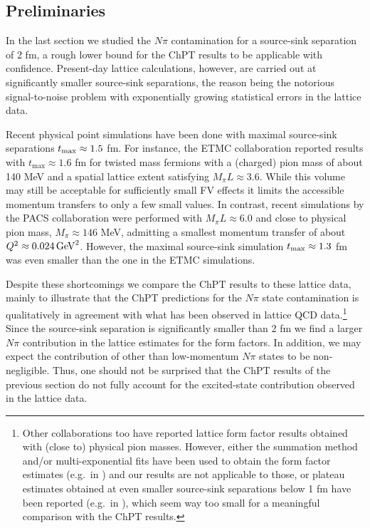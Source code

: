 \documentclass[11pt,prd,aps,showpacs,eqsecnum,floatfix,nofootinbib,preprint,tightenlines]{revtex4}
\begin{document}
 \subsection{Preliminaries}

In the last section we studied the $N\pi$ contamination for a source-sink separation of 2 fm, a rough lower bound for the ChPT results to be applicable with confidence. Present-day lattice calculations, however, are carried out at significantly smaller source-sink separations, the reason being the notorious signal-to-noise problem \cite{Parisi:1983ae,Lepage:1989hd} with exponentially growing statistical errors in the lattice data. 

Recent physical point simulations have been done with maximal source-sink separations $t_{\rm max} \approx 1.5$ fm. For instance, the ETMC collaboration reported results  \cite{Alexandrou:2018sjm} with $t_{\max}\approx 1.6$ fm for twisted mass fermions with a (charged) pion mass of about 140 MeV and a spatial lattice extent satisfying  $M_{\pi}L\approx 3.6$. While this volume may still be acceptable for sufficiently small FV effects it limits the accessible momentum transfers to only a few small values.
In contrast, recent simulations by the PACS collaboration \cite{Ishikawa:2018rew}  were performed with $M_\pi L\approx 6.0$ and close to physical pion mass, $M_{\pi} \approx 146$ MeV, admitting a smallest momentum transfer of about $Q^2 \approx 0.024\,{\rm GeV}^2$. However, the maximal source-sink simulation $t_{\rm max} \approx 1.3$ fm was even smaller than the one in the ETMC simulations.

Despite these shortcomings we compare the ChPT results to these lattice data, mainly to illustrate that the ChPT predictions for the $N\pi$ state contamination is qualitatively in agreement with what has been observed in lattice QCD data.\footnote{Other collaborations too have reported lattice form factor results obtained with (close to) physical pion masses. However, either the summation method \cite{Maiani:1987by,Capitani:2012gj} and/or multi-exponential fits have been used to obtain the form factor estimates (e.g.\ in \cite{Jang:2019jkn,Djukanovic:2021cgp,Park:2021ypf}) and our results are not applicable to those, or plateau estimates obtained at even smaller source-sink separations below 1 fm have been reported (e.g.\ in \cite{Hasan:2017wwt}), which seem way too small for a meaningful comparison with the ChPT results.}
Since the source-sink separation is significantly smaller than 2 fm we find a larger $N\pi$ contribution in the lattice estimates for the form factors. In addition, we may expect the contribution of other than low-momentum $N\pi$ states to be non-negligible. Thus, one should not be surprised that the ChPT results of the previous section do not fully account for the excited-state contribution observed in the lattice data.
   
\end{document}
